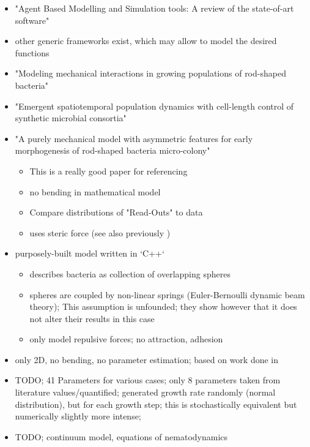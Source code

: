 \documentclass{article}
\begin{document}
\begin{itemize}
    \item \cite{Abar2017} "Agent Based Modelling and Simulation tools: A review of the state-of-art software"
    \item other generic frameworks exist, which may allow to model the desired functions
    \item \cite{Winkle2017} "Modeling mechanical interactions in growing populations of rod-shaped bacteria"
    \item \cite{Winkle2021} "Emergent spatiotemporal population dynamics with cell-length control of synthetic microbial consortia"
    \item \cite{Doumic2020} "A purely mechanical model with asymmetric features for early morphogenesis of
  rod-shaped bacteria micro-colony"
    \begin{itemize}
        \item This is a really good paper for referencing
        \item no bending in mathematical model
        \item Compare distributions of "Read-Outs" to data
        \item uses steric force (see also previously \cite{Trejo2013})
    \end{itemize}
    \item \cite{Grant2014} purposely-built model written in `C++`
    \begin{itemize}
        \item describes bacteria as collection of overlapping spheres
        \item spheres are coupled by non-linear springs (Euler-Bernoulli dynamic beam theory);
        This assumption is unfounded; they show however that it does not alter their results in this
        case
        \item only model repulsive forces; no attraction, adhesion
    \end{itemize}
    \item \cite{Cho2007} only 2D, no bending, no parameter estimation; based on work done in 
        \cite{Jnsson2005}
    \item \cite{Storck2014} TODO;
    41 Parameters for various cases;
    only 8 parameters taken from literature values/quantified;
    generated growth rate randomly (normal distribution), but for each growth step; this is
      stochastically equivalent but numerically slightly more intense;
    \item \cite{Volfson2008} TODO; continuum model, equations of nematodynamics \cite{Doi1988-ad}

\end{itemize}
\end{document}
